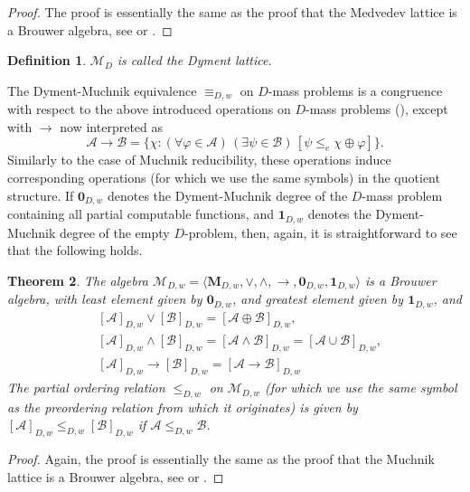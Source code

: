 \documentclass[11pt]{amsart}
\renewcommand{\phi}{\varphi}
\newtheorem{theorem}{Theorem}[section]
\newtheorem{defi}[theorem]{Definition}
\newenvironment{definition}{\begin{defi} \rm}{ \end{defi}}
\newcommand{\imp}{\rightarrow}
\newcommand{\MP}[1]{\ensuremath{\mathcal{#1}}}
\newcommand{\QA}[1]{(\forall{#1})\,}
\newcommand{\QE}[1]{(\exists{#1})\,}
\begin{document}
\begin{proof}
The proof is essentially the same as the proof that the Medvedev lattice is a 
Brouwer algebra, see \cite{Medvedev} or \cite[\S~13.7]{Rogers:Book}. 
\end{proof}

\begin{definition}
$\mathscr{M}_{D}$ is called the \emph{Dyment lattice}. 
\end{definition}

The Dyment-Muchnik equivalence $\equiv_{D,w}$ on $D$-mass problems is a 
congruence with respect to the above introduced operations on $D$-mass  
problems (\cite{Dyment:Someproperties}), except with $\to$ now interpreted as
\[
\MP{A} \to \MP{B} = 
\{\chi: \QA{\phi \in 
\mathcal{A}}\QE{\psi\in \mathcal{B}}[\psi \leq_e \chi \oplus \phi]\}.
\]
Similarly to the case of Muchnik reducibility, these operations induce 
corresponding operations (for which we use the same symbols) in the quotient 
structure. If $\mathbf{0}_{D,w}$ denotes the Dyment-Muchnik degree of the 
$D$-mass  problem containing all partial computable functions, and 
$\mathbf{1}_{D,w}$ denotes the Dyment-Muchnik degree of the empty 
$D$-problem, then, again, it is straightforward to see that the following 
holds. 

\begin{theorem}
The algebra $\mathscr{M}_{D,w}= \langle \textbf{M}_{D,w}, \lor, \wedge, 
\rightarrow, \mathbf{0}_{D,w}, \mathbf{1}_{D,w}\rangle$ is a Brouwer algebra, 
with least element given by $\mathbf{0}_{D,w}$, and greatest element given by  
$\mathbf{1}_{D,w}$, and 
\begin{align*}
&[\MP{A}]_{D,w} \lor [\MP{B}]_{D,w}=[\MP{A}\oplus  \MP{B}]_{D,w},\\
&[\MP{A}]_{D,w} \wedge [\MP{B}]_{D,w}=[\MP{A} \wedge \MP{B}]_{D,w}=[\MP{A} \cup \MP{B}]_{D,w},\\
&[\MP{A}]_{D,w} \imp [\MP{B}]_{D,w}=[\MP{A} \imp \MP{B}]_{D,w}
\end{align*}
The partial ordering relation $\le_{D,w}$ on $\mathscr{M}_{D,w}$ (for which 
we use the same symbol as the preordering relation from which it originates) 
is given by $[\MP{A}]_{D,w}\le_{D,w} [\MP{B}]_{D,w}$ if $\MP{A}\leq_{D,w} 
\MP{B}$. 
\end{theorem}

\begin{proof}
Again, the proof is essentially the same as the proof that the Muchnik 
lattice is a Brouwer algebra, see \cite{Muchnik:Lattice} or 
\cite{Sorbi:Someremarks}. 
\end{proof}
\end{document}
